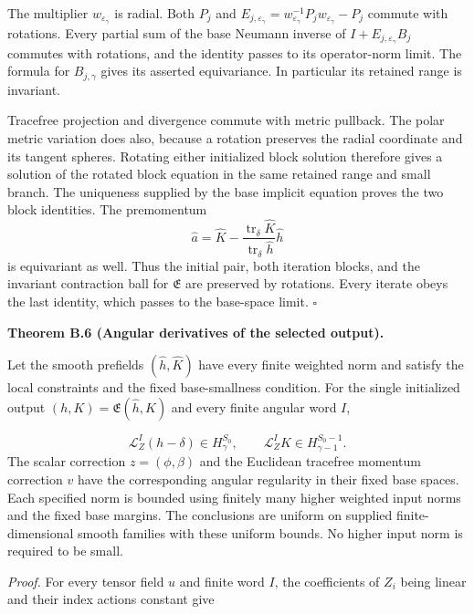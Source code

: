\documentclass[
  english,
  11pt,
  reqno]{amsart}
\makeatletter
\newcommand{\pandocstatementheading}[1]{%
  \par\addpenalty{\@beginparpenalty}%
  \addvspace{.5\baselineskip plus .2\baselineskip minus .2\baselineskip}%
  {\normalfont\bfseries #1\par}%
  \nobreak\@afterindenttrue\@afterheading
}
\makeatother
\begin{document}
The multiplier \(w_{\varepsilon_\gamma}\) is radial. Both \(P_j\) and
\(E_{j,\varepsilon_\gamma}=w_{\varepsilon_\gamma}^{-1}P_jw_{\varepsilon_\gamma}-P_j\)
commute with rotations. Every partial sum of the base Neumann inverse of
\(I+E_{j,\varepsilon_\gamma}B_j\) commutes with rotations, and the
identity passes to its operator-norm limit. The formula for
\(B_{j,\gamma}\) gives its asserted equivariance. In particular its
retained range is invariant.

Tracefree projection and divergence commute with metric pullback. The
polar metric variation does also, because a rotation preserves the
radial coordinate and its tangent spheres. Rotating either initialized
block solution therefore gives a solution of the rotated block equation
in the same retained range and small branch. The uniqueness supplied by
the base implicit equation proves the two block identities. The
premomentum \[
\widehat a=\widehat K-
\frac{\operatorname{tr}_\delta\widehat K}
{\operatorname{tr}_\delta\widehat h}\widehat h
\] is equivariant as well. Thus the initial pair, both iteration blocks,
and the invariant contraction ball for \(\mathfrak E\) are preserved by
rotations. Every iterate obeys the last identity, which passes to the
base-space limit. \hfill\(\square\)

\pandocstatementheading{\leavevmode{}\label{thm:online-extension-all-angular-derivatives}Theorem B.6 (Angular derivatives of the selected output).}

Let the smooth prefields \((\widehat h,\widehat K)\) have every finite
weighted norm and satisfy the local constraints and the fixed
base-smallness condition. For the single initialized output
\((h,K)=\mathfrak E(\widehat h,\widehat K)\) and every finite angular
word \(I\),

\label{eq:online-extension-angular-base-estimates} \[
\mathcal L_Z^I(h-\delta)\in H^{S_0}_\gamma,
\qquad
\mathcal L_Z^I K\in H^{S_0-1}_{\gamma-1}.
\] The scalar correction \(z=(\phi,\beta)\) and the Euclidean tracefree
momentum correction \(v\) have the corresponding angular regularity in
their fixed base spaces. Each specified norm is bounded using finitely
many higher weighted input norms and the fixed base margins. The
conclusions are uniform on supplied finite-dimensional smooth families
with these uniform bounds. No higher input norm is required to be small.

\emph{Proof.} For every tensor field \(u\) and finite word \(I\), the
coefficients of \(Z_i\) being linear and their index actions constant
give
\end{document}
